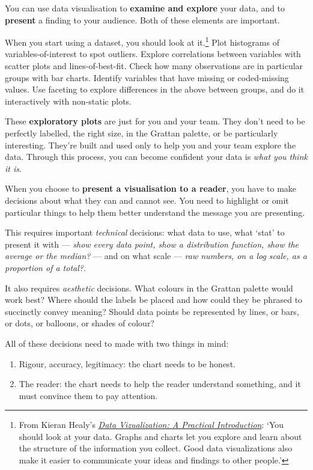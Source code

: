 \documentclass[
]{book}
\providecommand{\tightlist}{%
  \setlength{\itemsep}{0pt}\setlength{\parskip}{0pt}}
\begin{document}
You can use data visualisation to \textbf{examine and explore} your data, and to \textbf{present} a finding to your audience. Both of these elements are important.

When you start using a dataset, you should look at it.\footnote{From Kieran Healy's \href{https://socviz.co/}{\emph{Data Vizualization: A Practical Introduction}}: `You should look at your data. Graphs and charts let you explore and learn about the structure of the information you collect. Good data visualizations also make it easier to communicate your ideas and findings to other people.'} Plot histograms of variables-of-interest to spot outliers. Explore correlations between variables with scatter plots and lines-of-best-fit. Check how many observations are in particular groups with bar charts. Identify variables that have missing or coded-missing values. Use faceting to explore differences in the above between groups, and do it interactively with non-static plots.

These \textbf{exploratory plots} are just for you and your team. They don't need to be perfectly labelled, the right size, in the Grattan palette, or be particularly interesting.
They're built and used only to help you and your team explore the data.
Through this process, you can become confident your data is \emph{what you think it is}.

When you choose to \textbf{present a visualisation to a reader}, you have to make decisions about what they can and cannot see. You need to highlight or omit particular things to help them better understand the message you are presenting.

This requires important \emph{technical} decisions: what data to use, what `stat' to present it with --- \emph{show every data point, show a distribution function, show the average or the median?} --- and on what scale --- \emph{raw numbers, on a log scale, as a proportion of a total?}.

It also requires \emph{aesthetic} decisions. What colours in the Grattan palette would work best? Where should the labels be placed and how could they be phrased to succinctly convey meaning? Should data points be represented by lines, or bars, or dots, or balloons, or shades of colour?

All of these decisions need to made with two things in mind:

\begin{enumerate}
\def\labelenumi{\arabic{enumi}.}
\tightlist
\item
  Rigour, accuracy, legitimacy: the chart needs to be honest.
\item
  The reader: the chart needs to help the reader understand something, and it must convince them to pay attention.
\end{enumerate}
\end{document}
